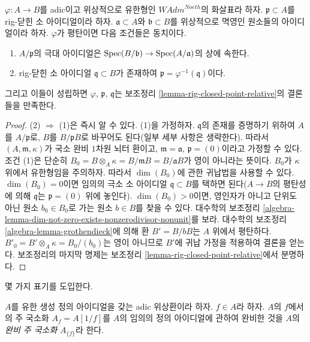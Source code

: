 \begin{lemma}
\label{lemma-rig-closed-point-in-image}
$\varphi : A \to B$를 adic이고 위상적으로 유한형인
$\textit{WAdm}^{Noeth}$의 화살표라 하자.
$\mathfrak p \subset A$를 rig-닫힌 소 아이디얼이라 하자.
$\mathfrak a \subset A$와 $\mathfrak b \subset B$를
위상적으로 멱영인 원소들의 아이디얼이라 하자.
$\varphi$가 평탄이면 다음 조건들은 동치이다.
\begin{enumerate}
\item $A/\mathfrak p$의 극대 아이디얼은
$\mathop{\mathrm{Spec}}(B/\mathfrak b) \to \mathop{\mathrm{Spec}}(A/\mathfrak a)$의 상에 속한다.
\item rig-닫힌 소 아이디얼 $\mathfrak q \subset B$가 존재하여
$\mathfrak p = \varphi^{-1}(\mathfrak q)$이다.
\end{enumerate}
그리고 이들이 성립하면 $\varphi$, $\mathfrak p$, $\mathfrak q$는
보조정리 \ref{lemma-rig-closed-point-relative}의 결론들을 만족한다.
\end{lemma}

\begin{proof}
(2) $\Rightarrow$ (1)은 즉시 알 수 있다. (1)을 가정하자.
$\mathfrak q$의 존재를 증명하기 위하여 $A$를 $A/\mathfrak p$로,
$B$를 $B/\mathfrak p B$로 바꾸어도 된다(일부 세부 사항은 생략한다).
따라서 $(A, \mathfrak m, \kappa)$가 국소 완비 $1$차원 뇌터 환이고,
$\mathfrak m = \mathfrak a$, $\mathfrak p = (0)$이라고 가정할 수 있다.
조건 (1)은 단순히
$B_0 = B \otimes_A \kappa = B/\mathfrak m B = B/\mathfrak a B$가
영이 아니라는 뜻이다. $B_0$가 $\kappa$ 위에서 유한형임을 주의하자.
따라서 $\dim(B_0)$에 관한 귀납법을 사용할 수 있다.
$\dim(B_0) = 0$이면 임의의 극소 소 아이디얼 $\mathfrak q \subset B$를
택하면 된다($A \to B$의 평탄성에 의해 $\mathfrak q$는
$\mathfrak p = (0)$ 위에 놓인다).
$\dim(B_0) > 0$이면, 영인자가 아니고 단위도 아닌
원소 $b_0 \in B_0$로 가는 원소 $b \in B$를 찾을 수 있다.
대수학의 보조정리
\ref{algebra-lemma-dim-not-zero-exists-nonzerodivisor-nonunit}를 보라.
대수학의 보조정리 \ref{algebra-lemma-grothendieck}에 의해
환 $B' = B/bB$는 $A$ 위에서 평탄하다.
$B'_0 = B' \otimes_A \kappa = B_0/(b_0)$는 영이 아니므로
$B'$에 귀납 가정을 적용하여 결론을 얻는다.
보조정리의 마지막 명제는 보조정리
\ref{lemma-rig-closed-point-relative}에서 분명하다.
\end{proof}

\noindent
몇 가지 표기를 도입한다.

\begin{definition}
\label{definition-completed-principal-localization}
$A$를 유한 생성 정의 아이디얼을 갖는 adic 위상환이라 하자.
$f \in A$라 하자. $A$의 $f$에서의 주 국소화
$A_f = A[1/f]$를 $A$의 임의의 정의 아이디얼에 관하여 완비한 것을
$A$의 {\it 완비 주 국소화} $A_{\{f\}}$라 한다.
\end{definition}

